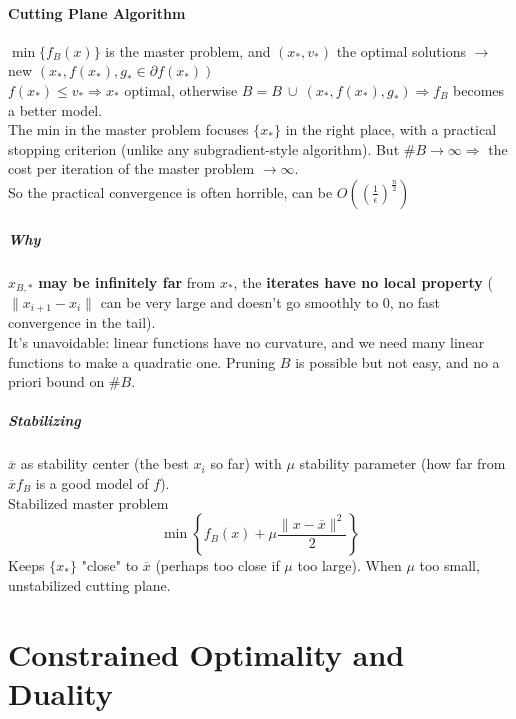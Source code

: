 \documentclass[10pt]{report}
\begin{document}
\paragraph{Cutting Plane Algorithm} $\min\{f_B(x)\}$ is the master problem, and $(x_*, v_*)$ the optimal solutions $\rightarrow$ new $(x_*, f(x_*), g_*\in\partial f(x_*))$\\
$f(x_*)\leq v_*\Rightarrow x_*$ optimal, otherwise $B= B\:\cup\:(x_*, f(x_*), g_*)\Rightarrow f_B$ becomes a better model.\\
The min in the master problem focuses $\{x_*\}$ in the right place, with a practical stopping criterion (unlike any subgradient-style algorithm). But $\#B\rightarrow\infty\Rightarrow$ the cost per iteration of the master problem $\rightarrow\infty$.\\
So the practical convergence is often horrible, can be $O\left( \left(\frac{1}{\epsilon}\right)^{\frac{n}{2}}\right)$
\subparagraph{Why} $x_{B,*}$ \textbf{may be infinitely far} from $x_*$, the \textbf{iterates have no local property} ($\|x_{i+1}-x_i\|$ can be very large and doesn't go smoothly to $0$, no fast convergence in the tail).\\
It's unavoidable: linear functions have no curvature, and we need many linear functions to make a quadratic one. Pruning $B$ is possible but not easy, and no a priori bound on $\# B$.
\subparagraph{Stabilizing} $\overline{x}$ as stability center (the best $x_i$ so far) with $\mu$ stability parameter (how far from $\overline{x} f_B$ is a good model of $f$).\\
Stabilized master problem $$\min\left\{f_B(x)+\mu\frac{\|x-\overline{x}\|^2}{2}\right\}$$ Keeps $\{x_*\}$ "close" to $\overline{x}$ (perhaps too close if $\mu$ too large). When $\mu$ too small, unstabilized cutting plane.
\section{Constrained Optimality and Duality}
\end{document}
